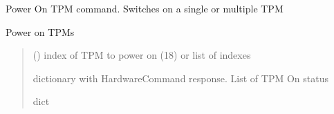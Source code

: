 \documentclass[letterpaper,10pt,english]{sphinxmanual}
\begin{document}
\begin{fulllineitems}
\label{\detokenize{webserverdocs:subrack_hardware.PowerOnTpmCommand}}
\pysigstartsignatures
{}
\pysigstopsignatures
\sphinxAtStartPar
Power On TPM command. Switches on a single or multiple TPM

\begin{fulllineitems}
\label{\detokenize{webserverdocs:subrack_hardware.PowerOnTpmCommand.thread}}
\pysigstartsignatures
{}
\pysigstopsignatures
\sphinxAtStartPar
Power on TPMs
\begin{quote}\begin{description}
\sphinxAtStartPar
{} (\sphinxstyleliteralemphasis{\sphinxupquote{, }}\sphinxstyleliteralemphasis{\sphinxupquote{(}}\sphinxstyleliteralemphasis{\sphinxupquote{)}}) \textendash{} index of TPM to power on (1\sphinxhyphen{}8) or list of indexes

\sphinxAtStartPar
dictionary with HardwareCommand response. List of TPM On status

\sphinxAtStartPar
dict

\end{description}\end{quote}

\end{fulllineitems}


\end{fulllineitems}

\end{document}
